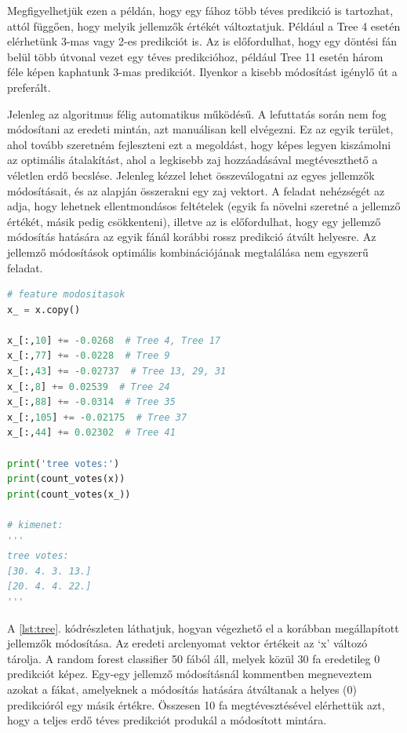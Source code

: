 Megfigyelhetjük ezen a példán, hogy egy fához több téves predikció is tartozhat, attól függően, hogy melyik jellemzők értékét változtatjuk. Például a Tree 4 esetén elérhetünk 3-mas vagy 2-es predikciót is. Az is előfordulhat, hogy egy döntési fán belül több útvonal vezet egy téves predikcióhoz, például Tree 11 esetén három féle képen kaphatunk 3-mas predikciót. Ilyenkor a kisebb módosítást igénylő út a preferált. 

Jelenleg az algoritmus félig automatikus működésű. A lefuttatás során nem fog módosítani az eredeti mintán, azt manuálisan kell elvégezni. Ez az egyik terület, ahol tovább szeretném fejleszteni ezt a megoldást, hogy képes legyen kiszámolni az optimális átalakítást, ahol a legkisebb zaj hozzáadásával megtéveszthető a véletlen erdő becslése. Jelenleg kézzel lehet összeválogatni az egyes jellemzők módosításait, és az alapján összerakni egy zaj vektort. A feladat nehézségét az adja, hogy lehetnek ellentmondásos feltételek (egyik fa növelni szeretné a jellemző értékét, másik pedig csökkenteni), illetve az is előfordulhat, hogy egy jellemző módosítás hatására az egyik fánál korábbi rossz predikció átvált helyesre. Az jellemző módosítások optimális kombinációjának megtalálása nem egyszerű feladat.

\begin{lstlisting}[language=python, caption={Korábbi elemzés alapján manuálisan elvégzett jellemző módosítások.}, label=lst:tree]
# feature modositasok
x_ = x.copy()

x_[:,10] += -0.0268  # Tree 4, Tree 17
x_[:,77] += -0.0228  # Tree 9
x_[:,43] += -0.02737  # Tree 13, 29, 31
x_[:,8] += 0.02539  # Tree 24
x_[:,88] += -0.0314  # Tree 35
x_[:,105] += -0.02175  # Tree 37
x_[:,44] += 0.02302  # Tree 41

print('tree votes:')
print(count_votes(x))
print(count_votes(x_))

# kimenet:
'''
tree votes:
[30. 4. 3. 13.]
[20. 4. 4. 22.]
'''
\end{lstlisting}

A \ref{lst:tree}. kódrészleten láthatjuk, hogyan végezhető el a korábban megállapított jellemzők módosítása. Az eredeti arclenyomat vektor értékeit az ‘x’ változó tárolja. A random forest classifier 50 fából áll, melyek közül 30 fa eredetileg 0 predikciót képez. Egy-egy jellemző módosításnál kommentben megneveztem azokat a fákat, amelyeknek a módosítás hatására átváltanak a helyes (0) predikcióról egy másik értékre. Összesen 10 fa megtévesztésével elérhettük azt, hogy a teljes erdő téves predikciót produkál a módosított mintára. 

